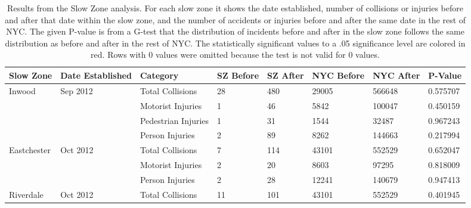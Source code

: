\documentclass[10pt,journal,compsoc]{IEEEtran}
\begin{document}
\begin{table}[]
\centering
\caption{Results from the Slow Zone analysis.  For each slow zone it shows the date established, number of collisions or injuries before and after that date within the slow zone, and the number of accidents or injuries before and after the same date in the rest of NYC.  The given P-value is from a G-test that the distribution of incidents before and after in the slow zone follows the same distribution as before and after in the rest of NYC.  The statistically significant values to a .05 significance level are colored in red. Rows with 0 values were omitted because the test is not valid for 0 values.}
\label{tab:sz}
\begin{tabular}{|l|l|l|l|l|l|l|l|}
\hline
Slow Zone                                      & Date Established            & Category            & SZ Before & SZ After & NYC Before & NYC After & P-Value  \\ \hline
\multirow{4}{*}{Inwood}                        & \multirow{4}{*}{Sep 2012} & Total Collisions    & 28        & 480      & 29005      & 566648    & 0.575707 \\ \cline{3-8} 
                                               &                             & Motorist Injuries   & 1         & 46       & 5842       & 100047    & 0.450159 \\ \cline{3-8} 
                                               &                             & Pedestrian Injuries & 1         & 31       & 1544       & 32487     & 0.967243 \\ \cline{3-8} 
                                               &                             & Person Injuries     & 2         & 89       & 8262       & 144663    & 0.217994 \\ \hline
\multirow{3}{*}{Eastchester}                   & \multirow{3}{*}{Oct 2012} & Total Collisions    & 7         & 114      & 43101      & 552529    & 0.652047 \\ \cline{3-8} 
                                               &                             & Motorist Injuries   & 2         & 20       & 8603       & 97295     & 0.818009 \\ \cline{3-8} 
                                               &                             & Person Injuries     & 2         & 28       & 12241      & 140679    & 0.947413 \\ \hline
Riverdale                                      & Oct 2012                  & Total Collisions    & 11        & 101      & 43101      & 552529    & 0.401945 \\ \hline

\end{tabular}
\end{table}
\end{document}
